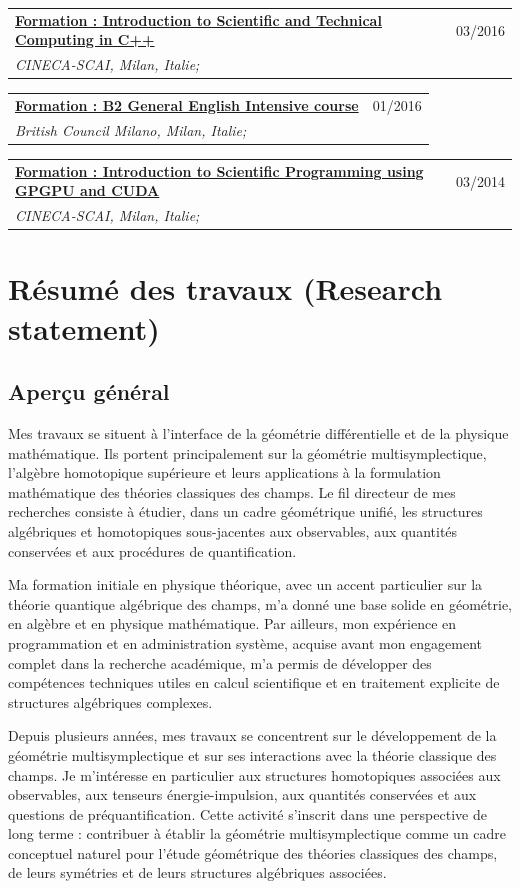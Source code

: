 \documentclass[a4paper]{article}
\newcommand{\longvoice}[8]{
	\begin{tabular}{p{0.9\textwidth} p{0.1\textwidth} }
		\textbf{\href{#3}{#2 : #1}} & #4
		\\
		\textit{#5, #6, #7;} & {\small\emph{#8}}
	\end{tabular}
	\vspace{.5em}
}
\begin{document}
		{}
	\longvoice{Introduction to Scientific and Technical Computing in C++}
		{Formation}
		{https://web.archive.org/save/http://www.hpc.cineca.it/content/introduction-object-oriented}
		{03/2016}
		{CINECA-SCAI}
		{Milan}
		{Italie}
		{}
	\longvoice{B2 General English Intensive course}
		{Formation}
		{https://www.britishcouncil.it/en/english/courses-adults/general}
		{01/2016}
		{British Council Milano}
		{Milan}
		{Italie}
		{}
	\longvoice{Introduction to Scientific Programming using GPGPU and CUDA}
		{Formation}
		{https://web.archive.org/web/20170623171128/http://www.hpc.cineca.it/content/introduction-to-gpu}
		{03/2014}
		{CINECA-SCAI}
		{Milan}
		{Italie}
		{}







	\clearpage
	\section*{Résumé des travaux (Research statement)}



\subsection*{Aperçu général}

Mes travaux se situent à l’interface de la géométrie différentielle et de la physique mathématique. Ils portent principalement sur la géométrie multisymplectique, l’algèbre homotopique supérieure et leurs applications à la formulation mathématique des théories classiques des champs. Le fil directeur de mes recherches consiste à étudier, dans un cadre géométrique unifié, les structures algébriques et homotopiques sous-jacentes aux observables, aux quantités conservées et aux procédures de quantification.

Ma formation initiale en physique théorique, avec un accent particulier sur la théorie quantique algébrique des champs, m’a donné une base solide en géométrie, en algèbre et en physique mathématique. Par ailleurs, mon expérience en programmation et en administration système, acquise avant mon engagement complet dans la recherche académique, m’a permis de développer des compétences techniques utiles en calcul scientifique et en traitement explicite de structures algébriques complexes.

Depuis plusieurs années, mes travaux se concentrent sur le développement de la géométrie multisymplectique et sur ses interactions avec la théorie classique des champs. Je m’intéresse en particulier aux structures homotopiques associées aux observables, aux tenseurs énergie-impulsion, aux quantités conservées et aux questions de préquantification. Cette activité s’inscrit dans une perspective de long terme : contribuer à établir la géométrie multisymplectique comme un cadre conceptuel naturel pour l’étude géométrique des théories classiques des champs, de leurs symétries et de leurs structures algébriques associées.
\end{document}
